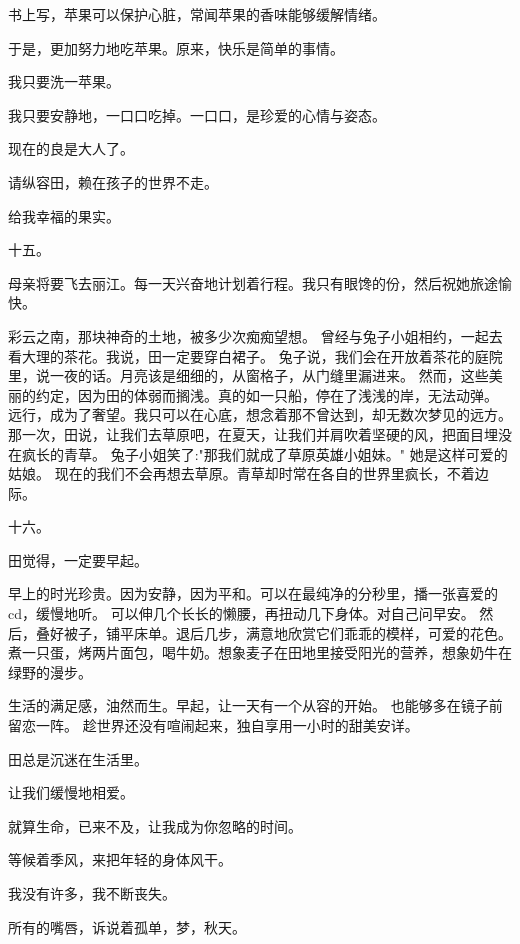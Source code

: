 \documentclass[12pt,a4paper]{article}
\def\blankrev{\vspace{1ex}}									%
\newcommand{\subpart}[1]{
	\begingroup \par
	\vspace{1ex} \centering #1
	\par \endgroup
}
\begin{document}
		\blankrev
		书上写，苹果可以保护心脏，常闻苹果的香味能够缓解情绪。\par
		于是，更加努力地吃苹果。原来，快乐是简单的事情。\par
		我只要洗一苹果。\par
		我只要安静地，一口口吃掉。一口口，是珍爱的心情与姿态。

		\blankrev
		现在的良是大人了。\par
		请纵容田，赖在孩子的世界不走。\par
		给我幸福的果实。


		\subpart{十五。}

		母亲将要飞去丽江。每一天兴奋地计划着行程。我只有眼馋的份，然后祝她旅途愉快。

		\blankrev
		彩云之南，那块神奇的土地，被多少次痴痴望想。
		曾经与兔子小姐相约，一起去看大理的茶花。我说，田一定要穿白裙子。
		兔子说，我们会在开放着茶花的庭院里，说一夜的话。月亮该是细细的，从窗格子，从门缝里漏进来。
		然而，这些美丽的约定，因为田的体弱而搁浅。真的如一只船，停在了浅浅的岸，无法动弹。
		远行，成为了奢望。我只可以在心底，想念着那不曾达到，却无数次梦见的远方。
		那一次，田说，让我们去草原吧，在夏天，让我们并肩吹着坚硬的风，把面目埋没在疯长的青草。
		兔子小姐笑了:"那我们就成了草原英雄小姐妹。"
		她是这样可爱的姑娘。
		现在的我们不会再想去草原。青草却时常在各自的世界里疯长，不着边际。


		\subpart{十六。}

		田觉得，一定要早起。

		\blankrev
		早上的时光珍贵。因为安静，因为平和。可以在最纯净的分秒里，播一张喜爱的cd，缓慢地听。
		可以伸几个长长的懒腰，再扭动几下身体。对自己问早安。
		然后，叠好被子，铺平床单。退后几步，满意地欣赏它们乖乖的模样，可爱的花色。
		煮一只蛋，烤两片面包，喝牛奶。想象麦子在田地里接受阳光的营养，想象奶牛在绿野的漫步。

		\blankrev
		生活的满足感，油然而生。早起，让一天有一个从容的开始。
		也能够多在镜子前留恋一阵。
		趁世界还没有喧闹起来，独自享用一小时的甜美安详。

		\blankrev
		田总是沉迷在生活里。

	\endwriting



		让我们缓慢地相爱。

		就算生命，已来不及，让我成为你忽略的时间。

		等候着季风，来把年轻的身体风干。

		我没有许多，我不断丧失。

		所有的嘴唇，诉说着孤单，梦，秋天。
\end{document}
